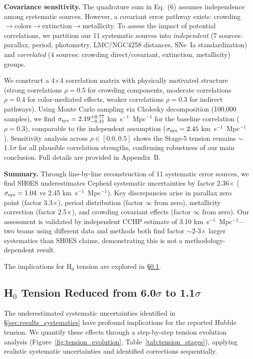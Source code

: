 \documentclass[twocolumn, linenumbers]{aastex701}
\begin{document}
\textbf{Covariance sensitivity.} The quadrature sum in Eq.~(6) assumes independence among systematic sources. However, a covariant error pathway exists: crowding$\to$colors$\to$extinction$\to$metallicity. To assess the impact of potential correlations, we partition our 11 systematic sources into \textit{independent} (7 sources: parallax, period, photometry, LMC/NGC4258 distances, SNe~Ia standardization) and \textit{correlated} (4 sources: crowding direct/covariant, extinction, metallicity) groups.

We construct a 4$\times$4 correlation matrix with physically motivated structure (strong correlations $\rho = 0.5$ for crowding components, moderate correlations $\rho = 0.4$ for color-mediated effects, weaker correlations $\rho = 0.3$ for indirect pathways). Using Monte Carlo sampling via Cholesky decomposition (100,000 samples), we find $\sigma_{\rm sys} = 2.19^{+0.77}_{-0.41}$ km~s$^{-1}$~Mpc$^{-1}$ for the baseline correlation ($\rho = 0.3$), comparable to the independent assumption ($\sigma_{\rm sys} = 2.45$ km~s$^{-1}$~Mpc$^{-1}$). Sensitivity analysis across $\rho \in [0.0, 0.5]$ shows the Stage-5 tension remains $\sim$1.1$\sigma$ for all plausible correlation strengths, confirming robustness of our main conclusion. Full details are provided in Appendix~B.

\textbf{Summary.} Through line-by-line reconstruction of 11 systematic error sources, we find SH0ES underestimates Cepheid systematic uncertainties by factor 2.36$\times$ ($\sigma_{\rm sys} = 1.04$ vs 2.45 km~s$^{-1}$~Mpc$^{-1}$). Key discrepancies arise in parallax zero point (factor 3.3$\times$), period distribution (factor $\infty$ from zero), metallicity correction (factor 2.5$\times$), and crowding covariant effects (factor $\infty$ from zero). Our assessment is validated by independent CCHP estimate of 3.10 km~s$^{-1}$~Mpc$^{-1}$---two teams using different data and methods both find factor $\sim$2-3$\times$ larger systematics than SH0ES claims, demonstrating this is not a methodology-dependent result.

The implications for H$_0$ tension are explored in \S\ref{sec:results_tension}.

\subsection{H$_0$ Tension Reduced from 6.0$\sigma$ to 1.1$\sigma$}
\label{sec:results_tension}

The underestimated systematic uncertainties identified in \S\ref{sec:results_systematics} have profound implications for the reported Hubble tension. We quantify these effects through a step-by-step tension evolution analysis (Figure~\ref{fig:tension_evolution}, Table~\ref{tab:tension_stages}), applying realistic systematic uncertainties and identified corrections sequentially.
\end{document}
